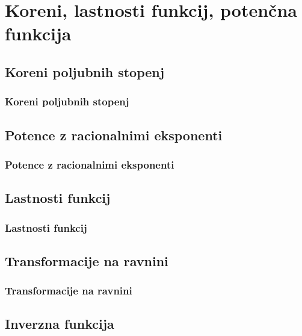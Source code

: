 \section{Koreni, lastnosti funkcij, potenčna funkcija}

\begin{frame}
    \sectionpage
\end{frame}

\begin{frame}
\end{frame}

    \subsection{Koreni poljubnih stopenj}

        \begin{frame}
            \frametitle{Koreni poljubnih stopenj}
        \end{frame}

    \subsection{Potence z racionalnimi eksponenti}

        \begin{frame}
            \frametitle{Potence z racionalnimi eksponenti}
        \end{frame}

    \subsection{Lastnosti funkcij}

        \begin{frame}
            \frametitle{Lastnosti funkcij}
        \end{frame}

    \subsection{Transformacije na ravnini}

        \begin{frame}
            \frametitle{Transformacije na ravnini}
        \end{frame}

    \subsection{Inverzna funkcija}

